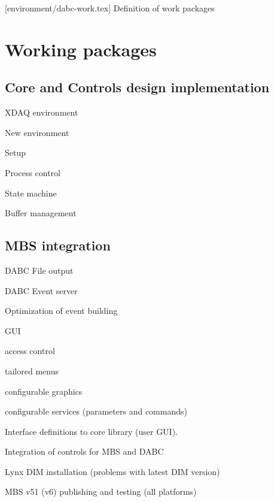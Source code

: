 [environment/dabc-work.tex]
Definition of work packages

\section{Working packages}
\subsection{Core and Controls design implementation}

\begin{compactitem}[$\bullet$]
\item XDAQ environment
\item New environment
\begin{compactitem}[$\circ$]
\item Setup
\item Process control
\item State machine
\end{compactitem}
\item Buffer management
\end{compactitem}

\subsection{MBS integration}

\begin{compactitem}[$\bullet$]
\item DABC File output
\item DABC Event server
\item Optimization of event building
\item GUI
\begin{compactitem}[$\circ$]
\item access control
\item tailored menus
\item configurable graphics
\item configurable services (parameters and commands)
\item Interface definitions to core library (user GUI).
\item Integration of controls for MBS and DABC
\end{compactitem}
\item Lynx DIM installation (problems with latest DIM version)
\item MBS v51 (v6) publishing and testing (all platforms)
\end{compactitem}

